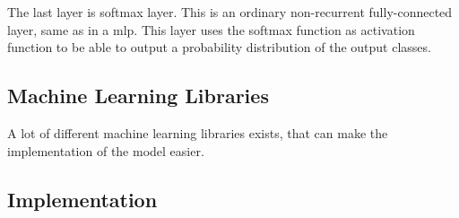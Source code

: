 The last layer is softmax layer. This is an ordinary non-recurrent fully-connected layer, same as in 
a \gls{mlp}. This layer uses the softmax function as activation function to be able to output 
a probability distribution of the output classes.
 


\subsection{Machine Learning Libraries}
A lot of different machine learning libraries exists, that can make the implementation of the model easier.

\subsection{Implementation}

